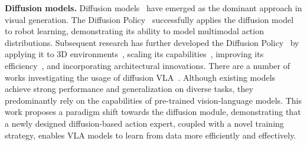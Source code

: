 \textbf{Diffusion models.} Diffusion models~\cite{chen2024yilun,peebles2023scalable,ho2020denoising} have emerged as the dominant approach in visual generation. The Diffusion Policy~\cite{diffusion-policy} successfully applies the diffusion model to robot learning, demonstrating its ability to model multimodal action distributions. Subsequent research has further developed the Diffusion Policy~\cite{aloha_unleashed, wang2024sparse-dp, prasad2024consistencypolicy, multimodal_diffusion_transformer, uehara2024fine, uehara2024feedback, black2023training, black2023zero, dasari2024ingredients, lin2024datascalinglawsimitation, dppo, wang2024inference, liu2022compositional} by applying it to 3D environments~\cite{3d_diffuser_actor, ze20243d, ze2024generalizable, yan2024dnact}, scaling its capabilities~\cite{scaledp}, improving its efficiency~\cite{mail-dp,prasad2024consistencypolicy}, and incorporating architectural innovations. There are a number of works investigating the usage of diffusion VLA~\cite{wen2024tinyvla, [pi0, wen2024diffusionvla}. Although existing models achieve strong performance and generalization on diverse tasks, they predominantly rely on the capabilities of pre-trained vision-language models. This work proposes a paradigm shift towards the diffusion module, demonstrating that a newly designed diffusion-based action expert, coupled with a novel training strategy, enables VLA models to learn from data more efficiently and effectively.